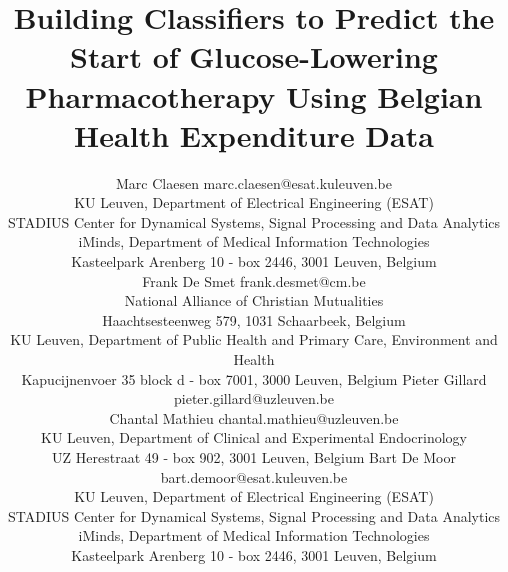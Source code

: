 \documentclass[twoside,11pt]{article}
\begin{document}
\title{Building Classifiers to Predict the Start of Glucose-Lowering Pharmacotherapy Using Belgian Health Expenditure Data}

\author{\name Marc Claesen \email marc.claesen@esat.kuleuven.be  \\ 
\addr KU Leuven, Department of Electrical Engineering (ESAT) \\
STADIUS Center for Dynamical Systems, Signal Processing and Data Analytics \\ 
iMinds, Department of Medical Information Technologies \\
Kasteelpark Arenberg 10 - box 2446, 3001 Leuven, Belgium \\
\name Frank De Smet \email frank.desmet@cm.be\\ 
\addr National Alliance of Christian Mutualities \\ 
Haachtsesteenweg 579, 1031 Schaarbeek, Belgium \\
\addr KU Leuven, Department of Public Health and Primary Care, Environment and Health \\
Kapucijnenvoer 35 block d - box 7001, 3000 Leuven, Belgium 
 \AND
\name Pieter Gillard \email pieter.gillard@uzleuven.be \\
\name Chantal Mathieu \email chantal.mathieu@uzleuven.be \\
\addr KU Leuven, Department of Clinical and Experimental Endocrinology \\
UZ Herestraat 49 - box 902, 3001 Leuven, Belgium 
 \AND
\name Bart De Moor \email bart.demoor@esat.kuleuven.be  \\ 
\addr KU Leuven, Department of Electrical Engineering (ESAT) \\
STADIUS Center for Dynamical Systems, Signal Processing and Data Analytics \\ 
iMinds, Department of Medical Information Technologies \\
Kasteelpark Arenberg 10 - box 2446, 3001 Leuven, Belgium
}


\maketitle
\end{document}
